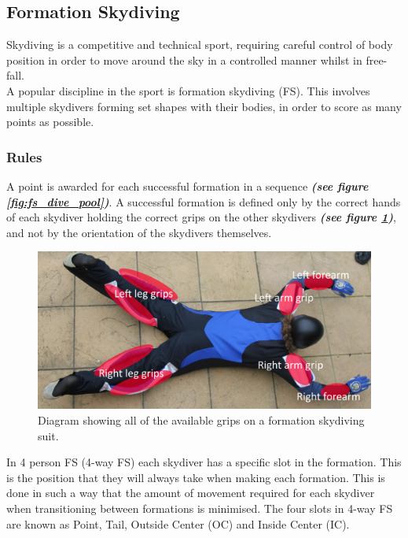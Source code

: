 \documentclass[a4paper, 12pt]{article}
\begin{document}
	\subsection{Formation Skydiving}
Skydiving is a competitive and technical sport, requiring careful control of body position in order to move around the sky in a controlled manner whilst in free-fall.\\
A popular discipline in the sport is formation skydiving (FS). This involves multiple skydivers forming set shapes with their bodies, in order to score as many points as possible.
		\subsubsection{Rules}
		A point is awarded for each successful formation in a sequence \textbf{\emph{(see figure \ref{fig:fs_dive_pool})}}. A successful formation is defined only by the correct hands of each skydiver holding the correct grips on the other skydivers \textbf{\emph{(see figure \ref{fig:grips})}}, and not by the orientation of the skydivers themselves.
%
\begin{figure}[H]
	\centering
	\includegraphics[width=0.9\linewidth]{grips.png}
	\caption{Diagram showing all of the available grips on a formation skydiving suit.}
	\label{fig:grips}
\end{figure}
%
\noindent In 4 person FS (4-way FS) each skydiver has a specific slot in the formation. This is the position that they will always take when making each formation. This is done in such a way that the amount of movement required for each skydiver when transitioning between formations is minimised. The four slots in 4-way FS are known as Point, Tail, Outside Center (OC) and Inside Center (IC). 
%
\end{document}
